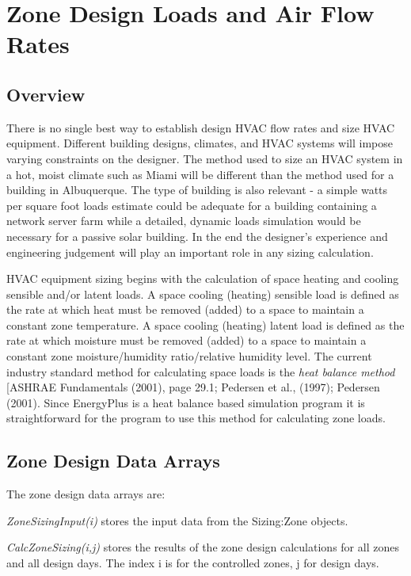 \section{Zone Design Loads and Air Flow Rates}\label{zone-design-loads-and-air-flow-rates}

\subsection{Overview}\label{overview-030}

There is no single best way to establish design HVAC flow rates and size HVAC equipment. Different building designs, climates, and HVAC systems will impose varying constraints on the designer. The method used to size an HVAC system in a hot, moist climate such as Miami will be different than the method used for a building in Albuquerque. The type of building is also relevant - a simple watts per square foot loads estimate could be adequate for a building containing a network server farm while a detailed, dynamic loads simulation would be necessary for a passive solar building. In the end the designer's experience and engineering judgement will play an important role in any sizing calculation.

HVAC equipment sizing begins with the calculation of space heating and cooling sensible and/or latent loads. A space cooling (heating) sensible load is defined as the rate at which heat must be removed (added) to a space to maintain a constant zone temperature. A space cooling (heating) latent load is defined as the rate at which moisture must be removed (added) to a space to maintain a constant zone moisture/humidity ratio/relative humidity level. The current industry standard method for calculating space loads is the \emph{heat balance method} {[}ASHRAE Fundamentals (2001), page 29.1; Pedersen et al., (1997); Pedersen (2001). Since EnergyPlus is a heat balance based simulation program it is straightforward for the program to use this method for calculating zone loads.

\subsection{Zone Design Data Arrays}\label{zone-design-data-arrays}

The zone design data arrays are:

\emph{ZoneSizingInput(i)} stores the input data from the Sizing:Zone objects.

\emph{CalcZoneSizing(i,j)} stores the results of the zone design calculations for all zones and all design days. The index i is for the controlled zones, j for design days.


